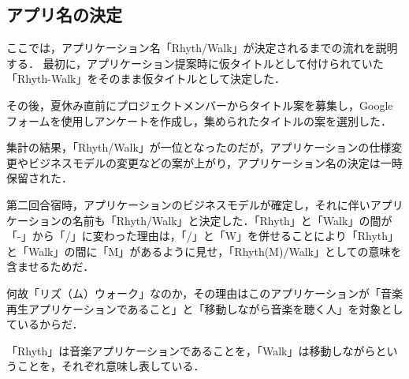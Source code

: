 \subsection{アプリ名の決定}
ここでは，アプリケーション名「Rhyth/Walk」が決定されるまでの流れを説明する．
最初に，アプリケーション提案時に仮タイトルとして付けられていた「Rhyth-Walk」をそのまま仮タイトルとして決定した．\par
その後，夏休み直前にプロジェクトメンバーからタイトル案を募集し，Googleフォームを使用しアンケートを作成し，集められたタイトルの案を選別した．\par
集計の結果，「Rhyth/Walk」が一位となったのだが，アプリケーションの仕様変更やビジネスモデルの変更などの案が上がり，アプリケーション名の決定は一時保留された．\par
第二回合宿時，アプリケーションのビジネスモデルが確定し，それに伴いアプリケーションの名前も「Rhyth/Walk」と決定した．「Rhyth」と「Walk」の間が「-」から「/」に変わった理由は，「/」と「W」を併せることにより「Rhyth」と「Walk」の間に「M」があるように見せ，「Rhyth(M)/Walk」としての意味を含ませるためだ．\par
何故「リズ（ム）ウォーク」なのか，その理由はこのアプリケーションが「音楽再生アプリケーションであること」と「移動しながら音楽を聴く人」を対象としているからだ．\par
「Rhyth」は音楽アプリケーションであることを，「Walk」は移動しながらということを，それぞれ意味し表している．
